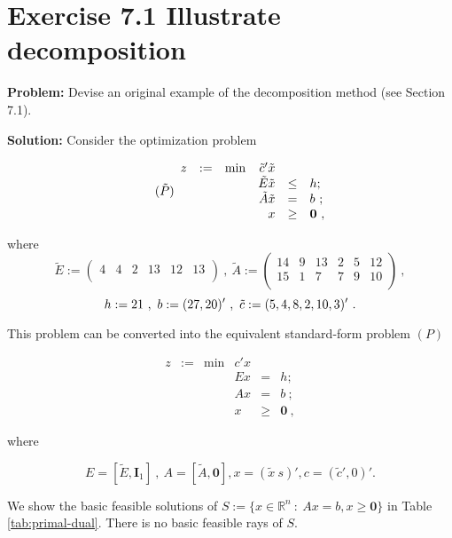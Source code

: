 \section{Exercise 7.1 Illustrate decomposition}
\textbf{Problem:} Devise an original example of the decomposition method (see Section 7.1).

\textbf{Solution:} Consider the optimization problem

\[
\tag{$\tilde{P}$}
\begin{array}{ccrrcl}
z & := & \min & \tilde{c}'\tilde{x}  &      &   \\
   &&   &  \tilde{E}\tilde{x}  &\leq & h; \\
   &&   &  \tilde{A}\tilde{x}  &   =  & b~; \\
   &&   &   x  & \geq & \mathbf{0}~,
\end{array}
\]

where
\[
\tilde{E}  :=  \left(
  \begin{array}{cccccc}
   4  &   4  &   2  &  13  &  12  &  13 \\
  \end{array}
\right)~,~
\tilde{A}  :=  \left(
  \begin{array}{cccccc}
      14   &  9  &  13  &   2  &   5  &  12 \\
    15   &  1  &   7  &   7   &  9  &  10 \\
  \end{array}
\right)~,
\]
\[
h  :=  21~,~
b  :=  (27,20)'~,~
\tilde{c}  :=  (5, 4, 8, 2, 10, 3)'~.\\
\]

This problem can be converted into the equivalent standard-form problem $(P)$ 

\[
\tag{$P$}
\begin{array}{ccrrcl}
z & := & \min & c'x  &      &   \\
   &&   &  Ex  & = & h; \\
   &&   &  Ax  &   =  & b~; \\
   &&   &   x  & \geq & \mathbf{0}~,
\end{array}
\]

where

$$ E = [\tilde{E}, \mathbf{I}_1]~,~ A = [\tilde{A}, \mathbf{0}], x = (\tilde{x}~s)', c=(\tilde{c}', 0)'. $$

We show the basic feasible solutions of $S := \{x\in \mathbb{R}^n~:~Ax=b,x\geq\mathbf{0}\}$ in Table \ref{tab:primal-dual}. There is no basic feasible rays of $S$.

